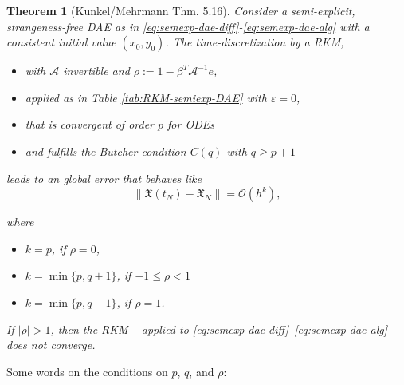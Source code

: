 \documentclass[]{book}
\providecommand{\tightlist}{%
  \setlength{\itemsep}{0pt}\setlength{\parskip}{0pt}}
\newtheorem{theorem}{Theorem}[chapter]
\theoremstyle{definition}
\theoremstyle{definition}
\theoremstyle{definition}
\theoremstyle{definition}
\theoremstyle{remark}
\begin{document}
\begin{theorem}[Kunkel/Mehrmann Thm. 5.16]
\protect\hypertarget{thm:unnamed-chunk-1}{}{\label{thm:unnamed-chunk-1} {} }Consider a semi-explicit, strangeness-free DAE as in \eqref{eq:semexp-dae-diff}-\eqref{eq:semexp-dae-alg} with a consistent initial value \((x_0, y_0)\). The time-discretization by a RKM,

\begin{itemize}
\tightlist
\item
  with \(\mathcal A\) invertible and \(\rho:=1-\beta^T\mathcal A^{-1}e\),
\item
  applied as in Table \ref{tab:RKM-semiexp-DAE} with \(\varepsilon=0\),
\item
  that is convergent of order \(p\) for ODEs
\item
  and fulfills the \emph{Butcher condition} \(C(q)\) with \(q\geq p+1\)
\end{itemize}

leads to an global error that behaves like
\[
\|\mathfrak X(t_N) - \mathfrak X_N\| = \mathcal O(h^k),
\]

where

\begin{itemize}
\tightlist
\item
  \(k=p\), if \(\rho=0\),
\item
  \(k=\min\{p, q+1\}\), if \(-1\leq \rho < 1\)
\item
  \(k=\min\{p, q-1\}\), if \(\rho =1\).
\end{itemize}

If \(|\rho|>1\), then the RKM -- applied to \eqref{eq:semexp-dae-diff}--\eqref{eq:semexp-dae-alg} -- does not converge.
\end{theorem}

Some words on the conditions on \(p\), \(q\), and \(\rho\):
\end{document}
